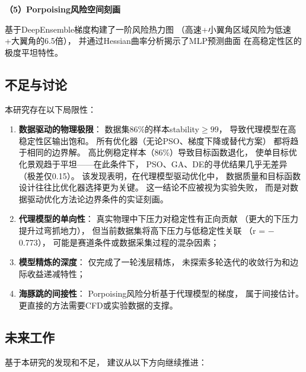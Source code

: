 \vspace{0.3cm}

\noindent
\textbf{（5）Porpoising风险空间刻画}

基于DeepEnsemble梯度构建了一阶风险热力图
（高速+小翼角区域风险为低速+大翼角的6.5倍），
并通过Hessian曲率分析揭示了MLP预测曲面
在高稳定性区的极度平坦特性。

\subsection{不足与讨论}

本研究存在以下局限性：

\begin{enumerate}
    \item \textbf{数据驱动的物理极限}：
        数据集86\%的样本stability$\geq 99$，
        导致代理模型在高稳定性区输出饱和。
        所有优化器（无论PSO、梯度下降或替代方案）
        都将趋于相同的边界解。
        高比例稳定样本（86\%）导致目标函数退化，
使单目标优化景观趋于平坦——在此条件下，
PSO、GA、DE的寻优结果几乎无差异（极差仅0.15）。
该发现表明，在代理模型驱动优化中，
数据质量和目标函数设计往往比优化器选择更为关键。
这一结论不应被视为实验失败，
而是对数据驱动优化方法论边界条件的实证刻画。
    \item \textbf{代理模型的单向性}：
        真实物理中下压力对稳定性有正向贡献
        （更大的下压力提升过弯抓地力），
        但当前数据集将高下压力与低稳定性关联
        （r = $-$0.773），
        可能是赛道条件或数据采集过程的混杂因素；
    \item \textbf{模型精炼的深度}：
        仅完成了一轮浅层精炼，
        未探索多轮迭代的收敛行为和边际收益递减特性；
    \item \textbf{海豚跳的间接性}：
        Porpoising风险分析基于代理模型的梯度，
        属于间接估计。
        更直接的方法需要CFD或实验数据的支撑。
\end{enumerate}

\subsection{未来工作}

基于本研究的发现和不足，
建议从以下方向继续推进：

